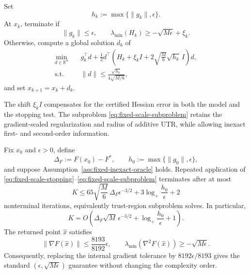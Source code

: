 Set
\begin{equation}
    h_k:=\max\{\|g_k\|,\epsilon\}.
    \label{eq:fixed-scale-h}
\end{equation}
At $x_k$, terminate if
\begin{equation}
    \|g_k\|\le\epsilon,
    \qquad
    \lambda_{\min}(H_k)
    \ge
    -\sqrt{M\epsilon}+\xi_k.
    \label{eq:fixed-scale-stopping}
\end{equation}
Otherwise, compute a global solution $d_k$ of
\begin{equation}
\begin{aligned}
    \min_{d\in\mathbb{R}^n}\quad
    &g_k^\top d
    +
    \frac12
    d^\top
    \left(
        H_k+\xi_kI
        +2\sqrt{\frac{M}{6}}\sqrt{h_k}\,I
    \right)d,
    \\
    \operatorname{s.t.}\quad
    &\|d\|
    \le
    \frac{\sqrt{h_k}}{4\sqrt{M/6}},
\end{aligned}
\label{eq:fixed-scale-subproblem}
\end{equation}
and set $x_{k+1}=x_k+d_k$.

The shift $\xi_kI$ compensates for the certified Hessian error in
both the model and the stopping test. The subproblem
\eqref{eq:fixed-scale-subproblem} retains the gradient-scaled
regularization and radius of additive UTR, while allowing inexact
first- and second-order information.

\begin{theorem}
\label{thm:fixed-scale-utr}
Fix $x_0$ and $\epsilon>0$, define
\[
    \Delta_F:=F(x_0)-F^*,
    \qquad
    h_0:=\max\{\|g_0\|,\epsilon\},
\]
and suppose Assumption~\ref{ass:fixed-inexact-oracle} holds.
Repeated application of
\eqref{eq:fixed-scale-stopping}--\eqref{eq:fixed-scale-subproblem}
terminates after at most
\begin{equation}
    K
    \le
    65\sqrt{\frac{M}{6}}\,
    \Delta_F\epsilon^{-3/2}
    +
    3\log_+\frac{h_0}{\epsilon}
    +2
    \label{eq:fixed-scale-complexity}
\end{equation}
nonterminal iterations, equivalently trust-region subproblem solves.
In particular,
\[
    K
    =
    O\!\left(
        \Delta_F\sqrt M\,\epsilon^{-3/2}
        +
        \log_+\frac{h_0}{\epsilon}
        +1
    \right).
\]
The returned point $\widehat x$ satisfies
\begin{equation}
    \|\nabla F(\widehat x)\|
    \le
    \frac{8193}{8192}\epsilon,
    \qquad
    \lambda_{\min}(\nabla^2F(\widehat x))
    \ge
    -\sqrt{M\epsilon}.
    \label{eq:fixed-scale-return}
\end{equation}
Consequently, replacing the internal gradient tolerance by
$8192\epsilon/8193$ gives the standard
$(\epsilon,\sqrt{M\epsilon})$ guarantee without changing the
complexity order.
\end{theorem}

